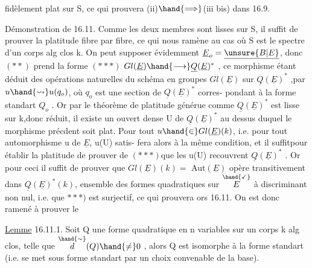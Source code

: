 
fidèlement plat sur S, ce qui prouvera  (ii)$\hand{\Longrightarrow}$(iii bis) dans  16.9.

Démonstration de 16.11.  Comme les deux membres sont lisses sur S,
il suffit de prouver la platitude fibre par fibre, ce qui nous ramène au
cas où S est le spectre d'un corps alg clos k.  On peut  supposer
évidemment $\underline{E}_o=\underline{\unsure{B|E}}$, donc $(**)$ prend la forme
$(***)$   $Gl(\underline{E})\hand{\longrightarrow}\underline{Q}(\underline{E})^*$ ,
ce morphisme étant déduit des opérations naturelles du schéma en groupes
$Gl(\underline{E})$ sur $\underline{Q}(\underline{E})^*$ ,par $u\hand{\rightsquigarrow} u(q_o)$, où $q_o$ est une section de $\underline{Q}(\underline{E})^*$ corres-%
pondant à la forme standart $Q_o$ . Or par le théorème de platitude générue\hand{,}
comme $\underline{Q}(\underline{E})^*$ est lisse sur k,donc réduit, il existe un ouvert dense U de
$\underline{Q}(\underline{E})^*$ au dessus duquel le morphisme précdent soit plat.  Pour tout 
$u\hand{\in}Gl(\underline{E})(k)$, i.e. pour tout automorphisme u de $\underline{E}$, u(U) satis-%
fera alors à la même condition, et il suffit\hand{$\unsure{\leftarrow}$}pour établir la platitude de prouver\hand{,} \hand{$\downarrow$}
de $(***)$\hand{,}que les u(U) recouvrent $\underline{Q}(\underline{E})^*$ . Or pour ceci il suffit de prouver
que $Gl(\underline{E})(k)=$ Aut$(\underline{E})$ opère transitivement dans $\underline{Q}(\underline{E})^*(k)$, ensemble des
formes quadratiques  sur $\overset{\hand{\checkmark}}{E}$ à discriminant non nul,  i.e. que
\unsure{}$***)$ est surjectif, ce qui prouvera ors 16.11.  On est donc ramené à
prouver le

\uline{Lemme} 16.11.1.  Soit Q une forme quadratique en n variables sur un corps k
alg clos, telle que $\overset{\hand{\sim}}{d}(Q)\hand{\neq} 0$ , alors Q est isomorphe à la forme standart
(i.e. se met sous forme standart par un choix convenable de la base).

